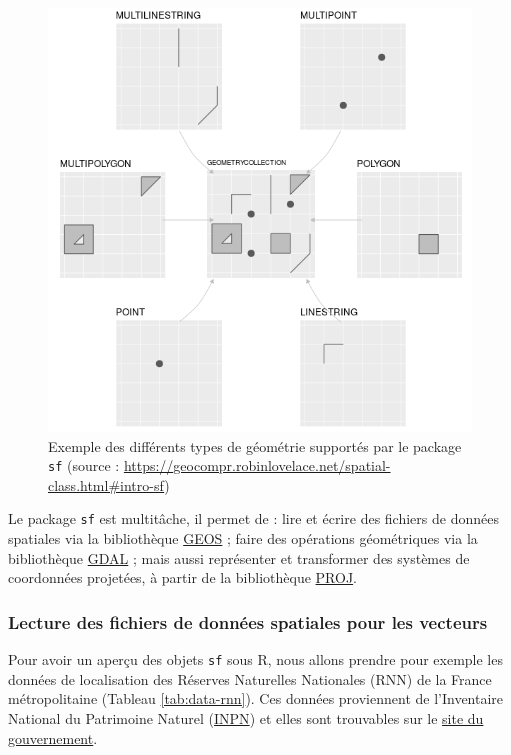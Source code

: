 \documentclass[
  french,
]{book}
\begin{document}
\begin{figure}

{\centering \includegraphics[width=0.6\linewidth]{images/sf-classes} 

}

\caption{Exemple des différents types de géométrie supportés par le package \texttt{sf} (source : \url{https://geocompr.robinlovelace.net/spatial-class.html\#intro-sf})}\label{fig:sfclasses}
\end{figure}

Le package \texttt{sf} est multitâche, il permet de : lire et écrire des fichiers de
données spatiales via la bibliothèque
\href{https://www.osgeo.org/projects/geos/}{GEOS} ; faire des opérations géométriques
via la bibliothèque \href{https://gdal.org/}{GDAL} ; mais aussi représenter et
transformer des systèmes de coordonnées projetées, à partir de la
bibliothèque \href{https://proj.org/}{PROJ}.

\hypertarget{lecture-des-fichiers-de-donnuxe9es-spatiales-pour-les-vecteurs}{%
\subsubsection{Lecture des fichiers de données spatiales pour les vecteurs}\label{lecture-des-fichiers-de-donnuxe9es-spatiales-pour-les-vecteurs}}

Pour avoir un aperçu des objets \texttt{sf} sous R, nous allons prendre pour exemple
les données de localisation des Réserves Naturelles Nationales (RNN) de la
France métropolitaine (Tableau \ref{tab:data-rnn}). Ces données proviennent de
l'Inventaire National du Patrimoine Naturel
(\href{https://inpn.mnhn.fr/accueil/index}{INPN}) et elles sont trouvables sur le
\href{https://www.data.gouv.fr/fr/datasets/inpn-donnees-du-programme-espaces-proteges/}{site du gouvernement}.
\end{document}
